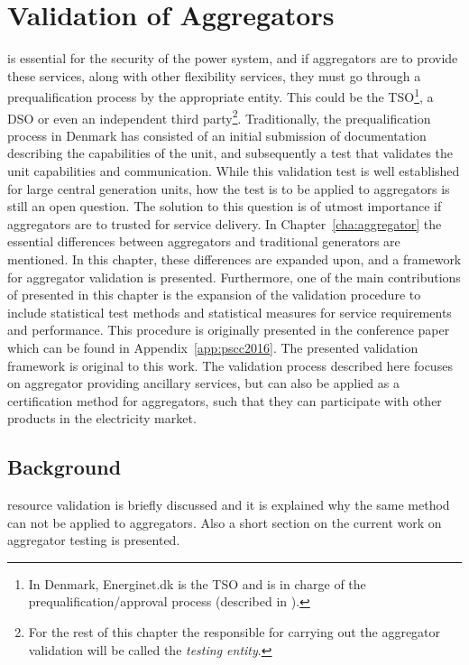 \chapter{Validation of Aggregators}
\label{cha:validation}
 is essential for the security of the power system, and if aggregators are to provide these services, along with other flexibility services, they must go through a prequalification process by the appropriate entity. This could be the TSO\footnote{In Denmark, Energinet.dk is the TSO and is in charge of the prequalification/approval process (described in \cite{EnerginetAncillary}).}, a DSO or even an independent third party\footnote{For the rest of this chapter the responsible for carrying out the aggregator validation will be called the \emph{testing entity}.}. Traditionally, the prequalification process in Denmark has consisted of an initial submission of documentation describing the capabilities of the unit, and subsequently a test that validates the unit capabilities and communication. While this validation test is well established for large central generation units, how the test is to be applied to aggregators is still an open question. The solution to this question is of utmost importance if aggregators are to trusted for service delivery. In Chapter~\ref{cha:aggregator} the essential differences between aggregators and traditional generators are mentioned. In this chapter, these differences are expanded upon, and a framework for aggregator validation is presented. Furthermore, one of the main contributions of presented in this chapter is the expansion of the validation procedure to include statistical test methods and statistical measures for service requirements and performance. This procedure is originally presented in the conference paper which can be found in Appendix~\ref{app:pscc2016}. The presented validation framework is original to this work. The validation process described here focuses on aggregator providing ancillary services, but can also be applied as a certification method for aggregators, such that they can participate with other products in the electricity market.

\section{Background}
 resource validation is briefly discussed and it is explained why the same method can not be applied to aggregators. Also a short section on the current work on aggregator testing is presented.

